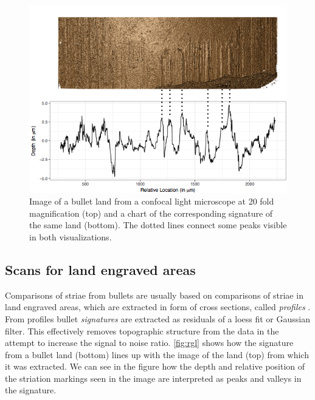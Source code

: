 \documentclass[12pt]{article}
\begin{document}
\begin{figure}
\centering
\includegraphics[width=\textwidth]{images/B6-B2-L6-rescaled.png}


\caption{\label{fig:rgl} Image of a bullet land from a confocal light microscope at 20 fold magnification (top) and a chart of the corresponding signature of the same land (bottom). The dotted lines connect some peaks visible in both visualizations.}

\end{figure}

\hypertarget{scans-for-land-engraved-areas}{%
\subsection{Scans for land engraved
areas}\label{scans-for-land-engraved-areas}}

Comparisons of striae from bullets are usually based on comparisons of
striae in land engraved areas, which are extracted in form of cross
sections, called \emph{profiles} \citep{aoas,ma2004}. From profiles
bullet \emph{signatures} \citep{chu2013,aoas} are extracted as residuals
of a loess fit or Gaussian filter. This effectively removes topographic
structure from the data in the attempt to increase the signal to noise
ratio. \autoref{fig:rgl} shows how the signature from a bullet land
(bottom) lines up with the image of the land (top) from which it was
extracted. We can see in the figure how the depth and relative position
of the striation markings seen in the image are interpreted as peaks and
valleys in the signature.
\end{document}
